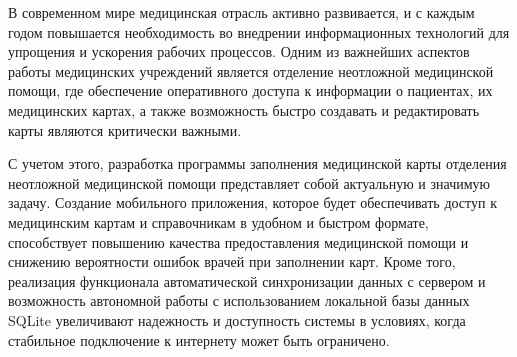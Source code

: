В современном мире медицинская отрасль активно развивается, и с каждым годом повышается необходимость во внедрении информационных технологий для упрощения и ускорения рабочих процессов. Одним из важнейших аспектов работы медицинских учреждений является отделение неотложной медицинской помощи, где обеспечение оперативного доступа к информации о пациентах, их медицинских картах, а также возможность быстро создавать и редактировать карты являются критически важными. 

С учетом этого, разработка программы заполнения медицинской карты отделения неотложной медицинской помощи представляет собой актуальную и значимую задачу. Создание мобильного приложения, которое будет обеспечивать доступ к медицинским картам и справочникам в удобном и быстром формате, способствует повышению качества предоставления медицинской помощи и снижению вероятности ошибок врачей при заполнении карт. Кроме того, реализация функционала автоматической синхронизации данных с сервером и возможность автономной работы с использованием локальной базы данных SQLite увеличивают надежность и доступность системы в условиях, когда стабильное подключение к интернету может быть ограничено.